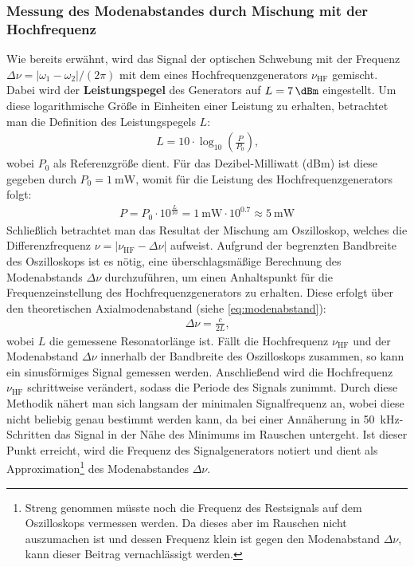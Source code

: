 \documentclass[11pt, a4paper]{article}
\numberwithin{equation}{section}
\begin{document}
\subsubsection{Messung des Modenabstandes durch Mischung mit der Hochfrequenz}
Wie bereits erwähnt, wird das Signal der optischen Schwebung mit der Frequenz $\Delta \nu = |\omega_1 - \omega_2| / (2\pi)$ mit dem eines Hochfrequenzgenerators $\nu_\mathrm{HF}$ gemischt.
Dabei wird der \textbf{Leistungspegel} des Generators auf $L = \SI{+7}{\dBm}$ eingestellt. Um diese logarithmische Größe in Einheiten einer Leistung zu erhalten, betrachtet man die Definition des Leistungspegels $L$: 
\begin{align}
	L = 10 \cdot \log_{10}\left( \frac{P}{P_0}\right) \text{,}
\end{align}
wobei $P_0$ als Referenzgröße dient.
Für das Dezibel-Milliwatt (\si{dBm}) ist diese gegeben durch $P_0 = \SI{1}{\milli\watt}$, womit für die Leistung des Hochfrequenzgenerators folgt:
\begin{align}
	P = P_0 \cdot 10^{\frac{L}{10}} = \SI{1}{\milli\watt} \cdot 10^{\num{0.7}} \approx \SI{5}{\milli\watt}
\end{align}
Schließlich betrachtet man das Resultat der Mischung am Oszilloskop, welches die Differenzfrequenz $\nu = |\nu_\mathrm{HF} - \Delta \nu|$ aufweist.
Aufgrund der begrenzten Bandbreite des Oszilloskops ist es nötig, eine überschlagsmäßige Berechnung des Modenabstands $\Delta \nu$ durchzuführen, um einen Anhaltspunkt für die Frequenzeinstellung des Hochfrequenzgenerators zu erhalten.
Diese erfolgt über den theoretischen Axialmodenabstand (siehe \eqref{eq:modenabstand}):
\begin{align}
	\Delta \nu = \frac{c}{2 L} \text{,}
\end{align}
wobei $L$ die gemessene Resonatorlänge ist.
Fällt die Hochfrequenz $\nu_\mathrm{HF}$ und der Modenabstand $\Delta \nu$ innerhalb der Bandbreite des Oszilloskops zusammen, so kann ein sinusförmiges Signal gemessen werden.
Anschließend wird die Hochfrequenz $\nu_\mathrm{HF}$ schrittweise verändert, sodass die Periode des Signals zunimmt.
Durch diese Methodik nähert man sich langsam der minimalen Signalfrequenz an, wobei diese nicht beliebig genau bestimmt werden kann, da bei einer Annäherung in \SI{50}{\kilo\hertz}-Schritten das Signal in der Nähe des Minimums im Rauschen untergeht.
Ist dieser Punkt erreicht, wird die Frequenz des Signalgenerators notiert und dient als Approximation\footnote{Streng genommen müsste noch die Frequenz des Restsignals auf dem Oszilloskops vermessen werden. Da dieses aber im Rauschen nicht auszumachen ist und dessen Frequenz klein ist gegen den Modenabstand $\Delta \nu$, kann dieser Beitrag vernachlässigt werden.} des Modenabstandes $\Delta \nu$.
\end{document}
